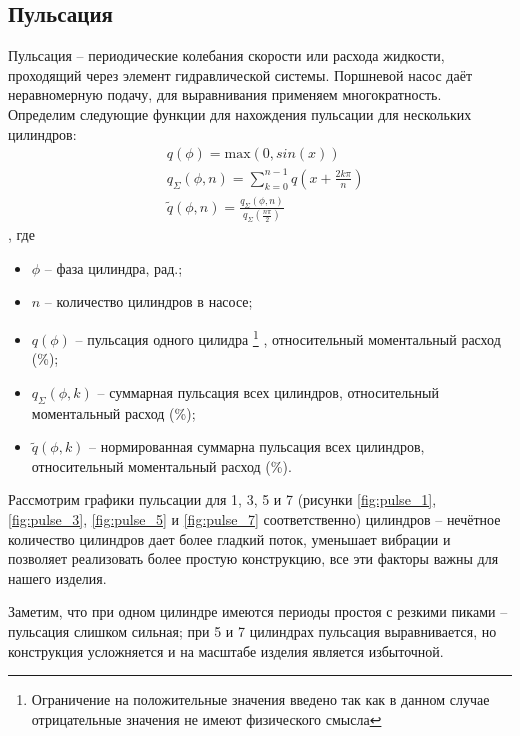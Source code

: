 \documentclass[12pt]{extarticle}
\begin{document}
\subsection{Пульсация}
Пульсация -- периодические колебания скорости или расхода жидкости, проходящий через элемент гидравлической системы.
Поршневой насос даёт неравномерную подачу, для выравнивания применяем многократность.
Определим следующие функции для нахождения пульсации для нескольких цилиндров:
\begin{align*}
    & q(\phi) = \text{max}(0, sin(x)) \\
    & q_\Sigma(\phi, n) = \sum_{k = 0}^{n - 1}q(x + \frac{2k\pi}{n}) \\
    & \tilde{q}(\phi, n) = \frac{q_\Sigma(\phi, n)}{q_\Sigma(\frac{n\pi}{2})}
\end{align*}
, где \begin{itemize}
    \item $\phi$ -- фаза цилиндра, рад.;
    \item $n$ -- количество цилиндров в насосе;
    \item $q(\phi)$ -- пульсация одного цилидра
        \footnote{Ограничение на положительные значения введено так как в данном случае отрицательные значения не имеют физического смысла}
        , относительный моментальный расход (\%);
    \item $q_\Sigma(\phi, k)$ -- суммарная пульсация всех цилиндров, относительный моментальный расход (\%);
    \item $\tilde{q}(\phi, k)$ -- нормированная суммарна пульсация всех цилиндров, относительный моментальный расход (\%).
\end{itemize}
Рассмотрим графики пульсации для 1, 3, 5 и 7 (рисунки \ref{fig:pulse_1}, \ref{fig:pulse_3}, \ref{fig:pulse_5} и \ref{fig:pulse_7} соответственно)
цилиндров -- нечётное количество цилиндров дает более гладкий поток, уменьшает
вибрации и позволяет реализовать более простую конструкцию, все эти факторы важны для нашего изделия.

Заметим, что при одном цилиндре имеются периоды простоя с резкими пиками -- пульсация слишком сильная;
при 5 и 7 цилиндрах пульсация выравнивается, но конструкция усложняется и на масштабе изделия является избыточной.
\end{document}
